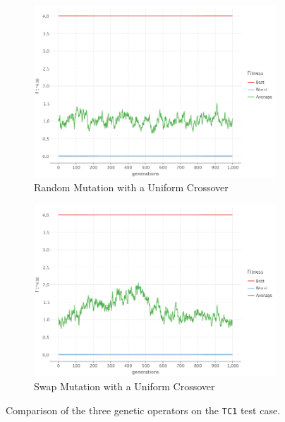 \begin{figure}[ht!]
\begin{subfigure}{0.45\textwidth}
            \includegraphics[width=\textwidth]{img/beacon_uniform_random_1.png}
            \caption{Random Mutation with a Uniform Crossover}
            \label{fig:beacon:3:random}
        \end{subfigure}
        \hfill
        \begin{subfigure}{0.45\textwidth}
            \includegraphics[width=\textwidth]{img/beacon_uniform_swap_1.png}
            \caption{Swap Mutation with a Uniform Crossover}
            \label{fig:beacon:3:swap}
        \end{subfigure}
        \caption{Comparison of the three genetic operators on the \texttt{TC1} test case.}
        \label{fig:beacon:1}
    \end{figure}
    

